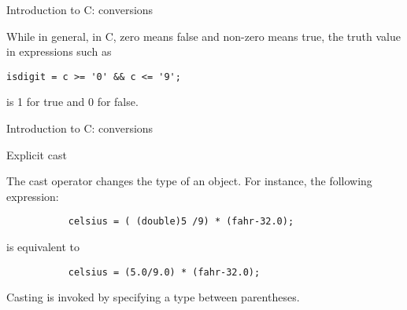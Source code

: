\begin{frame}[fragile]{Introduction to C: conversions}

While in general, in C, zero means false and non-zero means true,
the truth value in expressions such as


\vspace{20pt}

\begin{tt}
\begin{verbatim}isdigit = c >= '0' && c <= '9';
\end{verbatim}
\end{tt}


\vspace{20pt}

is 1 for true and 0 for false.


\end{frame}
\begin{frame}[fragile]{Introduction to C: conversions}
\begin{center}Explicit cast\end{center}

The cast operator changes the type of an object.
For instance, the following expression:


\vspace{20pt}

\begin{verbatim}
           celsius = ( (double)5 /9) * (fahr-32.0);
\end{verbatim}


\vspace{20pt}

is equivalent to 


\vspace{20pt}

\begin{verbatim}
           celsius = (5.0/9.0) * (fahr-32.0);
\end{verbatim}


\vspace{20pt}

Casting is invoked by specifying a type between parentheses.



\end{frame}
